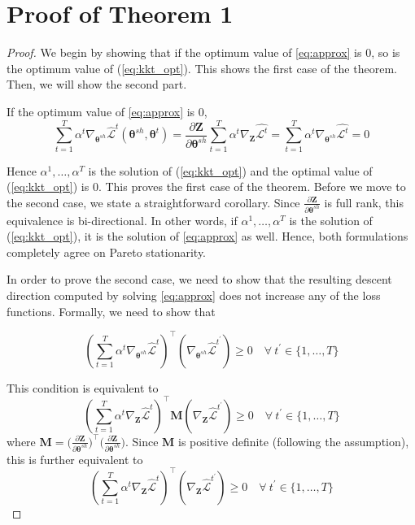 \documentclass{article}
\def\lL{\mathcal{L}}
\def\btheta{{\bm\theta}}
\begin{document}
\appendix
\section{Proof of Theorem 1}


\begin{proof}
We begin by showing that if the optimum value of \ref{eq:approx} is 0, so is the optimum value of (\ref{eq:kkt_opt}). This shows the first case of the theorem. Then, we will show the second part.

If the optimum value of \ref{eq:approx} is $0$,
\begin{equation}
\sum_{t=1}^T \alpha^t \nabla_{\btheta^{sh}}  \hat{\lL}^t(\btheta^{sh},\btheta^t) = \frac{\partial \mathbf{Z}}{\partial \mathbf{\theta}^{sh}} \sum_{t=1}^T \alpha^t \nabla_{\mathbf{Z}} \hat{\mathcal{L}^t} = \sum_{t=1}^T \alpha^t \nabla_{\mathbf{\theta}^{sh}} \hat{\mathcal{L}^t}=0
\end{equation}

Hence $\alpha^1,\ldots,\alpha^T$ is the solution of (\ref{eq:kkt_opt}) and the optimal value of (\ref{eq:kkt_opt}) is $0$. This proves the first case of the theorem. Before we move to the second case, we state a straightforward corollary. Since $ \frac{\partial \mathbf{Z}}{\partial \mathbf{\theta}^{sh}}$ is  full rank, this equivalence is bi-directional. In other words, if $\alpha^1,\ldots,\alpha^T$ is the solution of (\ref{eq:kkt_opt}), it is the solution of \ref{eq:approx} as well. Hence, both formulations completely agree on Pareto stationarity.


In order to prove the second case, we need to show that the resulting descent direction computed by solving \ref{eq:approx} does not increase any of the loss functions. Formally, we need to show that

\begin{equation}
\left(\sum_{t=1}^T \alpha^t \nabla_{\mathbf{\theta}^{sh}} \hat{\mathcal{L}}^t\right)^\intercal \left( \nabla_{\mathbf{\theta}^{sh}} \hat{\mathcal{L}}^{t^\prime}  \right) \geq 0 \quad \forall ~t^\prime \in \{1, \ldots, T\}
\end{equation}

This condition is equivalent to
\begin{equation}
\left(\sum_{t=1}^T \alpha^t \nabla_{\mathbf{Z}} \hat{\mathcal{L}}^t\right)^\intercal \mathbf{M} \left(\nabla_{\mathbf{Z}} \hat{\mathcal{L}}^{t^\prime}\right) \geq 0 \quad \forall ~ t^\prime \in \{1, \ldots, T\}
\end{equation}
where $\mathbf{M}=\big(\frac{\partial \mathbf{Z}}{\partial \mathbf{\theta}^{sh}}\big)^\intercal\big(\frac{\partial \mathbf{Z}}{\partial \mathbf{\theta}^{sh}}\big)$. Since $\mathbf{M}$ is positive definite (following the assumption), this is further equivalent to
\begin{equation}
\left(\sum_{t=1}^T \alpha^t \nabla_{\mathbf{Z}} \hat{\mathcal{L}}^t\right)^\intercal  \left(\nabla_{\mathbf{Z}} \hat{\mathcal{L}}^{t^\prime}\right) \geq 0 \quad \forall ~ t^\prime \in \{1, \ldots, T\}
\end{equation}


\end{proof}
\end{document}
